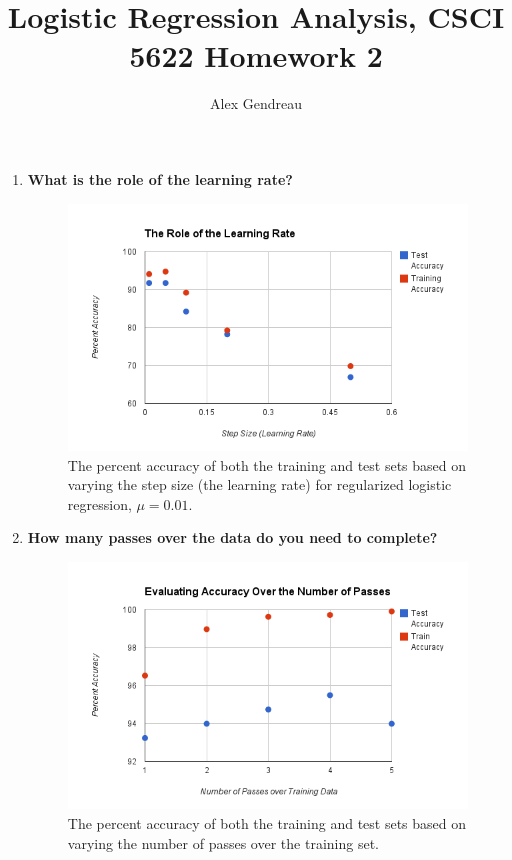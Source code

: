 \documentclass[110pt, oneside]{article}   	%
\title{Logistic Regression Analysis, CSCI 5622 Homework 2 \vspace{-2ex} }
\author{Alex Gendreau \vspace{-2ex}}
\date{\vspace{-2ex}}							%
\begin{document}
\maketitle \vspace{-2ex}


\begin{enumerate}
\item \textbf {What is the role of the learning rate?} \\
\begin{figure}[H]
\centering
\includegraphics[scale=0.3]{learningRate.png}
\caption{The percent accuracy of both the training and test sets based on varying the step size (the learning rate) for regularized logistic regression, $\mu=0.01$.}
\end{figure}

\item \textbf{How many passes over the data do you need to complete?}\\
\begin{figure}[H]
\centering
\includegraphics[scale=0.3]{passes.png}
\caption{The percent accuracy of both the training and test sets based on varying the number of passes over the training set.}
\end{figure}


\end{enumerate}
\end{document}
